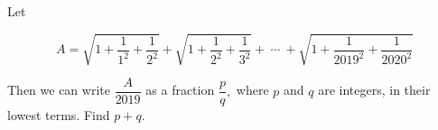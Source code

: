 Let

\[
A=\sqrt{1+\dfrac{1}{1^2}+\dfrac{1}{2^2}}+\sqrt{1+\dfrac{1}{2^2}+ \dfrac{1}{3^2}}+\ \cdots\ +\sqrt{1+\dfrac{1}{2019^2}+\dfrac{1}{2020^2}}
\]

Then we can write $\dfrac{A}{2019}$ as a fraction $\dfrac{p}{q},$ where $p$ and $q$ are integers, in their lowest terms. Find $p+q.$
